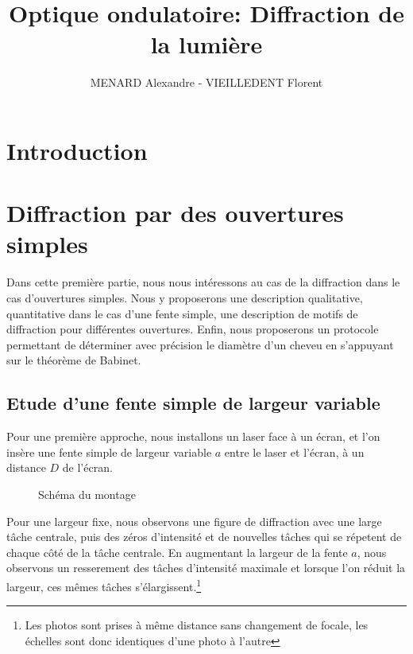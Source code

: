 \documentclass[12pt]{article}
\title{\textbf{Optique ondulatoire:} Diffraction de la lumière}
\author{MENARD Alexandre - VIEILLEDENT Florent}
\begin{document}
\maketitle

\section*{Introduction}

\break
\section{Diffraction par des ouvertures simples}
Dans cette première partie, nous nous intéressons au cas de la diffraction dans le cas d'ouvertures simples. Nous y proposerons une description qualitative, quantitative dans le cas d'une fente simple,
une description de motifs de diffraction pour différentes ouvertures. Enfin, nous proposerons un protocole permettant de déterminer avec précision le diamètre d'un cheveu en s'appuyant sur le théorème de Babinet.
\subsection{Etude d'une fente simple de largeur variable}
Pour une première approche, nous installons un laser face à un écran, et l'on insère une fente simple de largeur variable $a$ entre le laser et l'écran, à un distance $D$ de l'écran.
\begin{figure}[!h]
    \begin{center}
        \resizebox{0.7\textwidth}{5cm}{
        
        }
    \end{center}
    \caption{Schéma du montage}
    \label{fig:montage_simple}
\end{figure}

Pour une largeur fixe, nous observons une figure de diffraction avec une large tâche centrale, puis des zéros d'intensité et de nouvelles tâches qui se répetent de chaque côté de la tâche centrale.
En augmentant la largeur de la fente $a$, nous observons un resserement des tâches d'intensité maximale et lorsque l'on réduit la largeur, ces mêmes tâches s'élargissent.\footnote{Les photos sont prises à même distance sans changement de focale, les échelles sont donc identiques d'une photo à l'autre}
\end{document}
